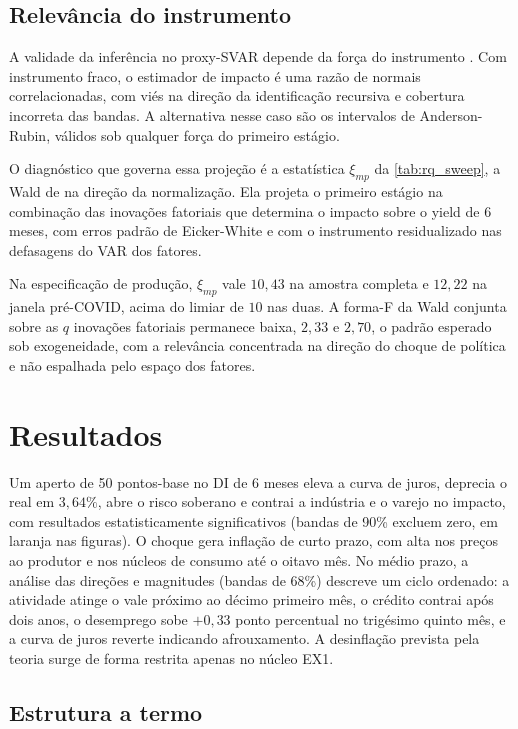 \documentclass[
article,			%
12pt,				%
oneside,			%
a4paper,			%
hidelinks, 
english,			%
brazil,				%
]{abntex2}
\theoremstyle{plain}
\theoremstyle{definition}
\theoremstyle{remark}
\begin{document}
\subsection{Relevância do instrumento}

A validade da inferência no proxy-SVAR depende da força do instrumento \cite{montielolea}. Com instrumento fraco, o estimador de impacto é uma razão de normais correlacionadas, com viés na direção da identificação recursiva e cobertura incorreta das bandas. A alternativa nesse caso são os intervalos de Anderson-Rubin, válidos sob qualquer força do primeiro estágio.

O diagnóstico que governa essa projeção é a estatística $\xi_{mp}$ da \autoref{tab:rq_sweep}, a Wald de  na direção da normalização. Ela projeta o primeiro estágio na combinação das inovações fatoriais que determina o impacto sobre o yield de 6 meses, com erros padrão de Eicker-White e com o instrumento residualizado nas defasagens do VAR dos fatores.

Na especificação de produção, $\xi_{mp}$ vale $10{,}43$ na amostra completa e $12{,}22$ na janela pré-COVID, acima do limiar de $10$ nas duas. A forma-F da Wald conjunta sobre as $q$ inovações fatoriais permanece baixa, $2{,}33$ e $2{,}70$, o padrão esperado sob exogeneidade, com a relevância concentrada na direção do choque de política e não espalhada pelo espaço dos fatores.




\section{Resultados}
\label{sec:resultados}

Um aperto de 50 pontos-base no DI de 6 meses eleva a curva de juros, deprecia o real em $3{,}64\%$, abre o risco soberano e contrai a indústria e o varejo no impacto, com resultados estatisticamente significativos (bandas de 90\% excluem zero, em laranja nas figuras). O choque gera inflação de curto prazo, com alta nos preços ao produtor e nos núcleos de consumo até o oitavo mês. No médio prazo, a análise das direções e magnitudes (bandas de 68\%) descreve um ciclo ordenado: a atividade atinge o vale próximo ao décimo primeiro mês, o crédito contrai após dois anos, o desemprego sobe $+0{,}33$ ponto percentual no trigésimo quinto mês, e a curva de juros reverte indicando afrouxamento. A desinflação prevista pela teoria surge de forma restrita apenas no núcleo EX1. 

\subsection{Estrutura a termo}
\end{document}
